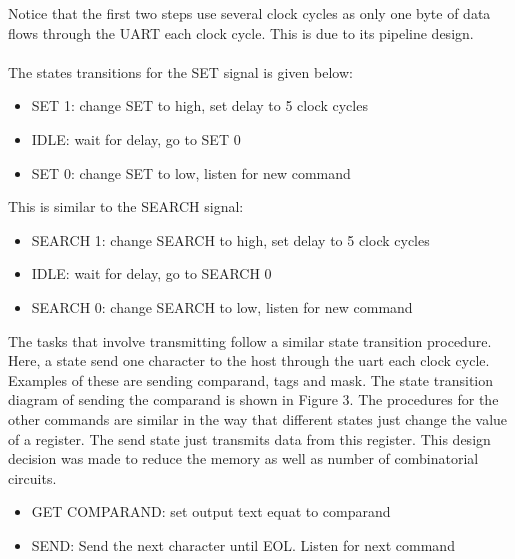 Notice that the first two steps use several clock cycles as only one byte of data flows through the UART each clock cycle. 
This is due to its pipeline design. 
\\\\
The states transitions for the SET signal is given below:
\begin{itemize}
    \item  SET 1: change SET to high, set delay to 5 clock cycles
    \item  IDLE: wait for delay, go to SET 0
    \item  SET 0: change SET to low, listen for new command
\end{itemize}
\vspace{5mm}
This is similar to the SEARCH signal:
\begin{itemize}
    \item  SEARCH 1: change SEARCH to high, set delay to 5 clock cycles
    \item  IDLE: wait for delay, go to SEARCH 0
    \item  SEARCH 0: change SEARCH to low, listen for new command
\end{itemize}
\vspace{5mm}
The tasks that involve transmitting follow a similar state transition procedure. 
Here, a state send one character to the host through the uart each clock cycle. 
Examples of these are sending comparand, tags and mask. 
The state transition diagram of sending the comparand is shown in Figure 3.
The procedures for the other commands are similar in the way that different states just change the value of a register. 
The send state just transmits data from this register. 
This design decision was made to reduce the memory as well as number of combinatorial circuits. 

\begin{itemize}
    \item  GET COMPARAND: set output text equat to comparand
    \item  SEND: Send the next character until EOL. Listen for next command
\end{itemize}

